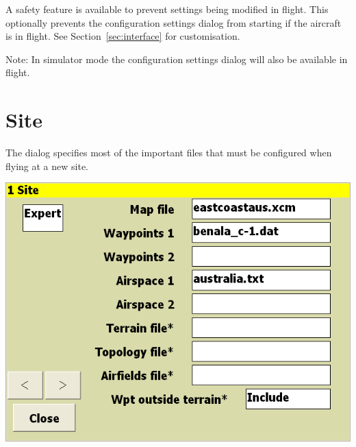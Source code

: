 \documentclass[a4paper,12pt]{refrep}
\begin{document}
A safety feature is available to prevent settings being modified in
flight.  This optionally prevents the configuration settings dialog
from starting if the aircraft is in flight. See Section~\ref{sec:interface} for customisation.

Note: In simulator mode the configuration settings dialog will also be available in flight.



\clearpage
\section{Site}
The dialog specifies most of the important files that must be
configured when flying at a new site.

\begin{center}
\includegraphics[angle=0,width=\linewidth,keepaspectratio='true']{figures/config-0.png}
\end{center}
\end{document}
